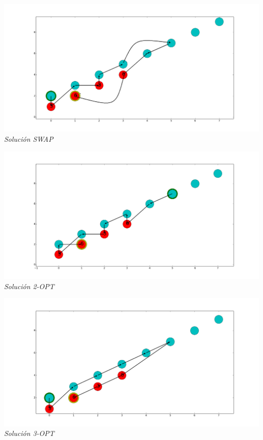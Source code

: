 \vspace*{0.3cm} \vspace*{0.3cm}
  \begin{center}
 \includegraphics[scale=0.3]{./EJ3/sinOrdenswap.png}\\
 {            \textit{Soluci\'on SWAP}}
  \end{center}
  \vspace*{0.3cm}

\vspace*{0.3cm} \vspace*{0.3cm}
  \begin{center}
 \includegraphics[scale=0.3]{./EJ3/sinOrden2opt.png}\\
 {            \textit{Soluci\'on 2-OPT}}
  \end{center}
  \vspace*{0.3cm}


\vspace*{0.3cm} \vspace*{0.3cm}
  \begin{center}
 \includegraphics[scale=0.3]{./EJ3/sinOrden3opt.png}\\
 {            \textit{Soluci\'on 3-OPT}}
  \end{center}
  \vspace*{0.3cm}


